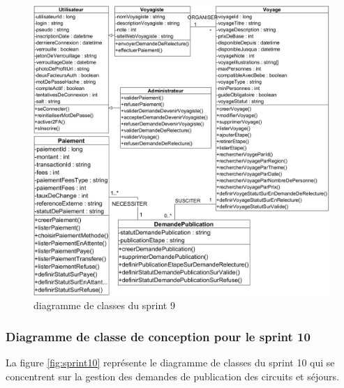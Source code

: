\documentclass[12pt]{report}
\begin{document}
			\begin{figure}[h]
				\centering
				\includegraphics[width=\textwidth]{sprint9.jpg}
				\caption{diagramme de classes du sprint 9}
				\label{fig:sprint9}
			\end{figure}
			\FloatBarrier

			\subsubsection{Diagramme de classe de conception pour le sprint 10}
				
			\hspace{15pt} La figure \ref{fig:sprint10} représente le diagramme de classes du sprint 10 qui se concentrent sur la gestion des demandes de publication des circuits et séjours.
\end{document}
